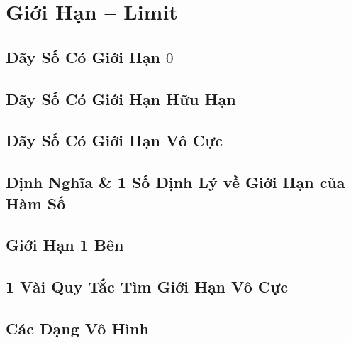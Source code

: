 \documentclass[oneside]{book}
\numberwithin{equation}{section}
\begin{document}
\chapter{Giới Hạn -- Limit}

\section{Dãy Số Có Giới Hạn $0$}


\section{Dãy Số Có Giới Hạn Hữu Hạn}


\section{Dãy Số Có Giới Hạn Vô Cực}


\section{Định Nghĩa \& 1 Số Định Lý về Giới Hạn của Hàm Số}


\section{Giới Hạn 1 Bên}


\section{1 Vài Quy Tắc Tìm Giới Hạn Vô Cực}


\section{Các Dạng Vô Hình}
\end{document}
